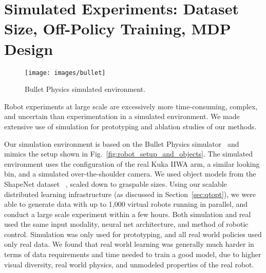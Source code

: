 \documentclass{article}
\begin{document}
\iffalse\begin{algorithm}[h]{\small
	\caption{Randomized scripted policy}
	\label{alg:servo}
	\begin{algorithmic}[1]
        \STATE Position the arm at random pose \(p\) above
        the bin at height \(h\).
        \STATE Sample \(k_1\) actions biased towards the
        bottom of the bin.
        \STATE Close the gripper.
        \STATE Sample \(k_2\) actions biased upwards from
        the bin.
        \STATE Terminate the episode.
	\end{algorithmic}
}
\end{algorithm}\fi

\section{Simulated Experiments: Dataset Size, Off-Policy Training, MDP Design}
\label{sec:appendix_ablations_sim}
\begin{wrapfigure}{r}{0.22\textwidth}
\vspace{-0.4cm}
 \texttt{[image: images/bullet]}
\vspace{-0.4cm}
   \caption{Bullet Physics simulated environment.}
\vspace{-0.5cm}
\end{wrapfigure}
Robot experiments at large scale are excessively more time-consuming, complex, and uncertain than experimentation in a simulated environment.
We made extensive use of simulation for prototyping and ablation studies of our methods.

Our simulation environment is based on the Bullet Physics simulator~\citep{bullet} and mimics the setup shown in Fig.~\ref{fig:robot_setup_and_objects}. The simulated environment uses the configuration of the real Kuka IIWA arm, a similar looking bin, and a simulated over-the-shoulder camera. We used object models from the ShapeNet dataset ~\citep{shapenet}, scaled down to graspable sizes. Using our scalable distributed learning infrastructure (as discussed in Section~\ref{sec:qtopt}), we were able to generate data with up to 1,000 virtual robots running in parallel, and conduct a large scale experiment within a few hours. Both simulation and real used the same input modality, neural net architecture, and method of robotic control. Simulation was only used for prototyping, and all real world policies used only real data. We found that real world learning was generally much harder in terms of data requirements and time needed to train a good model, due to higher visual diversity, real world physics, and unmodeled properties of the real robot.
\end{document}

